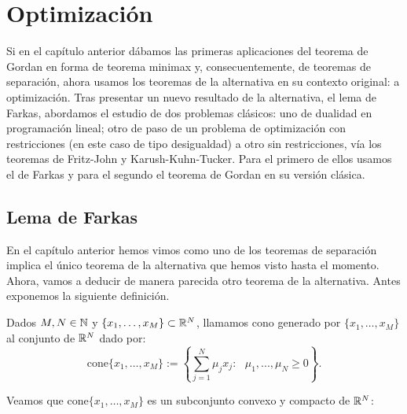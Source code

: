 \chapter{Optimización}
Si en el capítulo anterior dábamos las primeras aplicaciones del teorema de Gordan en forma de teorema minimax y, consecuentemente, de teoremas de separación, ahora usamos los teoremas de la alternativa en su contexto original: a optimización. Tras presentar un nuevo resultado de la alternativa, el lema de Farkas, abordamos el estudio de dos problemas clásicos: uno de dualidad en programación lineal; otro de paso de un problema de optimización con restricciones (en este caso de tipo desigualdad) a otro sin restricciones, vía los teoremas de Fritz-John y Karush-Kuhn-Tucker. Para el primero de ellos usamos el de Farkas y para el segundo el teorema de Gordan en su versión clásica.

\section{Lema de Farkas}
\newcommand{\bb}{\textbf{\emph{b}}}
\newcommand{\cc}{\textbf{\emph{c}}}

En el capítulo anterior hemos vimos como uno de los teoremas de separación implica el único teorema de la alternativa que hemos visto hasta el momento. Ahora, vamos a deducir de manera parecida otro teorema de la alternativa. Antes exponemos la siguiente definición.

\begin{definicion}
	Dados $ M, N \in \mathbb{N} $ y $ \{x_1,\dots, x_M \} \subset \mathbb{R}^N  $, llamamos cono generado por $ \{x_1,\dots, x_M \} $ al conjunto de $ \mathbb{R}^N $ dado por:
	\begin{equation*}
	\mathrm{cone}\{x_1,\dots, x_M \} := \left\lbrace \sum_{j=1}^{N}{\mu_j x_j } : \text{ } \mu_1,...,\mu_N \geq 0 \right\rbrace .
	\end{equation*}
\end{definicion}

Veamos que $ \mathrm{cone}\{x_1,\dots, x_M \} $ es un subconjunto convexo y compacto de $ \mathbb{R}^N $:


